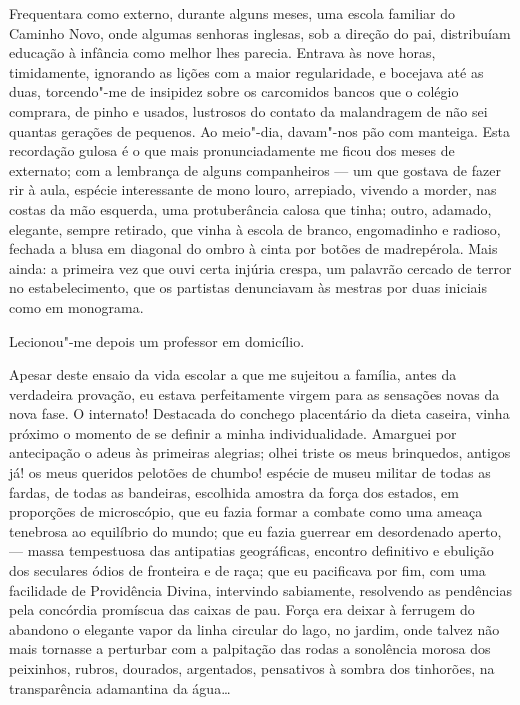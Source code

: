 Frequentara como externo, durante alguns
meses, uma escola familiar do Caminho Novo, onde algumas senhoras
inglesas, sob a direção do pai, distribuíam educação à infância como
melhor lhes parecia. Entrava às nove horas, timidamente, ignorando as
lições com a maior regularidade, e bocejava até as duas, torcendo"-me
de insipidez sobre os carcomidos bancos que o colégio comprara, de
pinho e usados, lustrosos do contato da malandragem de não sei quantas
gerações de pequenos. Ao meio"-dia, davam"-nos pão com manteiga. Esta
recordação gulosa é o que mais pronunciadamente me ficou dos meses de
externato; com a lembrança de alguns companheiros --- um que gostava de
fazer rir à aula, espécie interessante de mono louro, arrepiado,
vivendo a morder, nas costas da mão esquerda, uma protuberância calosa
que tinha; outro, adamado, elegante, sempre retirado, que vinha à
escola de branco, engomadinho e radioso, fechada a blusa em diagonal do
ombro à cinta por botões de madrepérola. Mais ainda: a primeira vez que
ouvi certa injúria crespa, um palavrão cercado de terror no
estabelecimento, que os partistas denunciavam às mestras por duas
iniciais como em monograma. 

Lecionou"-me depois um professor em domicílio. 

Apesar deste ensaio da vida escolar a que me sujeitou a
família, antes da verdadeira provação, eu estava perfeitamente virgem
para as sensações novas da nova fase. O internato! Destacada do
conchego placentário da dieta caseira, vinha próximo o momento de se
definir a minha individualidade. Amarguei por antecipação o adeus às primeiras alegrias;
olhei triste os meus brinquedos, antigos já! os meus queridos pelotões
de chumbo! espécie de museu militar de todas as fardas, de todas as
bandeiras, escolhida amostra da força dos estados, em proporções de
microscópio, que eu fazia formar a combate como uma ameaça tenebrosa ao
equilíbrio do mundo; que eu fazia guerrear em desordenado aperto, --- 
massa tempestuosa das antipatias geográficas, encontro definitivo e
ebulição dos seculares ódios de fronteira e de raça; que eu pacificava
por fim, com uma facilidade de Providência Divina, intervindo
sabiamente, resolvendo as pendências pela concórdia promíscua das
caixas de pau. Força era deixar à ferrugem do abandono o elegante vapor
da linha circular do lago, no jardim, onde talvez não mais tornasse a
perturbar com a palpitação das rodas a sonolência morosa dos peixinhos,
rubros, dourados, argentados, pensativos à sombra dos tinhorões, na
transparência adamantina da água\ldots{} 

